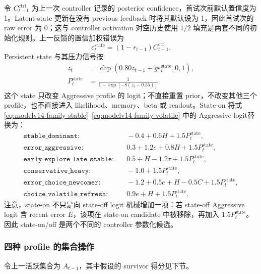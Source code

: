 令 $C_{t-1}^{\mathrm{ctrl}}$ 为上一次 controller 记录的 posterior confidence，首试次前默认置信度为 1。Latent-state 更新在没有 previous feedback 时将其默认设为 1，因此首试次的 raw error 为 0；这与 controller activation 对空历史使用 $1/2$ 填充是两套不同的初始化规则。上一反馈的置信加权错误为
\begin{equation}
    \varepsilon_t^{\mathrm{state}}
    =
    (1-r_{t-1})C_{t-1}^{\mathrm{ctrl}}.
    \label{eq:modelv14-state-error}
\end{equation}
Persistent state 与其压力信号按
\begin{align}
    z_t
    &=
    \operatorname{clip}
    \left(
        0.80z_{t-1}
        +
        g\varepsilon_t^{\mathrm{state}},
        0,1
    \right),\\
    P_t^{\mathrm{state}}
    &=
    \frac{1}{
        1+\exp[-8(z_t-0.55)]
    }.
    \label{eq:modelv14-state-dynamics}
\end{align}
这个 state 只改变 Aggressive profile 的 logit；不直接重置 prior，不改变其他三个 profile，也不直接进入 likelihood、memory、beta 或 readout。State-on 将式
\ref{eq:modelv14-family-stable}--\ref{eq:modelv14-family-volatile} 中的 Aggressive logit替换为：
\begin{align}
    \texttt{stable\_dominant}:&\quad
    -0.4+0.6H+1.5P_t^{\mathrm{state}},\\
    \texttt{error\_aggressive}:&\quad
    0.3+1.2e+0.8H+1.5P_t^{\mathrm{state}},\\
    \texttt{early\_explore\_late\_stable}:&\quad
    0.5+H-1.2\tau+1.5P_t^{\mathrm{state}},\\
    \texttt{conservative\_heavy}:&\quad
    -1.0+1.5P_t^{\mathrm{state}},\\
    \texttt{error\_choice\_newcomer}:&\quad
    -1.2+0.5e+H-0.5C+1.5P_t^{\mathrm{state}},\\
    \texttt{choice\_volatile\_refresh}:&\quad
    0.9e+H+1.5P_t^{\mathrm{state}}.
    \label{eq:modelv14-state-on-logits}
\end{align}
注意，state-on 不只是向 state-off logit 机械增加一项：若 state-off Aggressive logit 含 recent error $E$，该项在 state-on candidate 中被移除，再加入 $1.5P_t^{\mathrm{state}}$。因此 state-on/off 是两个不同的 controller 参数化候选。


\subsubsection{四种 profile 的集合操作}

令上一活跃集合为 $A_{t-1}$，其中假设的 survivor 得分见下节。

